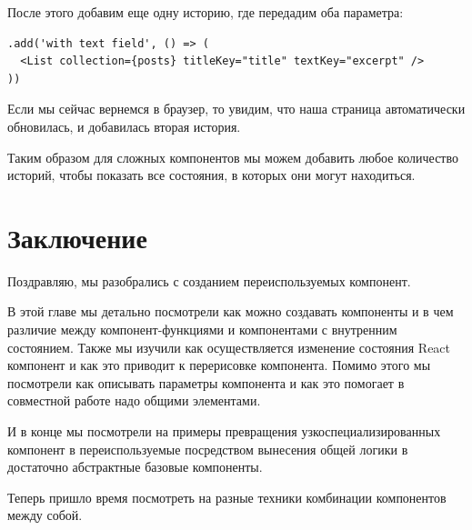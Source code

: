 После этого добавим еще одну историю, где передадим оба параметра:

\begin{lstlisting}
.add('with text field', () => (
  <List collection={posts} titleKey="title" textKey="excerpt" />
))
\end{lstlisting}

Если мы сейчас вернемся в браузер, то увидим, что наша страница автоматически обновилась, и добавилась вторая история.

Таким образом для сложных компонентов мы можем добавить любое количество историй, чтобы показать все состояния, в которых они могут находиться.

\section{Заключение}

Поздравляю, мы разобрались с созданием переиспользуемых компонент.

В этой главе мы детально посмотрели как можно создавать компоненты и в чем различие между компонент-функциями и компонентами с внутренним состоянием. Также мы изучили как осуществляется изменение состояния React компонент и как это приводит к перерисовке компонента. Помимо этого мы посмотрели как описывать параметры компонента и как это помогает в совместной работе надо общими элементами.

И в конце мы посмотрели на примеры превращения узкоспециализированных компонент в переиспользуемые посредством вынесения общей логики в достаточно абстрактные базовые компоненты.

Теперь пришло время посмотреть на разные техники комбинации компонентов между собой.


